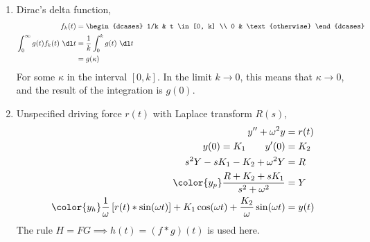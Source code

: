 \begin{enumerate}
\begin{enumerate}
              \item Dirac's delta function,
                    \begin{align}
                        f_k(t)        & = \begin{dcases}
                                              1/k & t \in [0, k]     \\
                                              0   & \text{otherwise}
                                          \end{dcases}              \\
                        \int_{0}^{\infty} g(t)
                        f_k(t)\ \dl t & = \frac{1}{k}\int_{0}^{k} g(t)\ \dl t \\
                                      & = g(\kappa)
                    \end{align}
                    For some $ \kappa $ in the interval $ [0, k] $. In the limit
                    $ k \rightarrow 0 $, this means that $ \kappa \rightarrow 0 $, and the
                    result of the integration is $ g(0) $.

              \item Unspecified driving force $ r(t) $ with Laplace transform $ R(s) $,
                    \begin{align}
                        y'' + \omega^2 y               & = r(t) \\
                        y(0) = K_1 \qquad y'(0)        & = K_2  \\
                        s^2Y - sK_1 - K_2 + \omega^2 Y & = R    \\
                        \color{y_p} \frac{R + K_2 + sK_1}
                        {s^2 + \omega^2}               & = Y    \\
                        \color{y_h} \frac{1}{\omega}
                        \left[ r(t) * \sin(\omega t) \right]
                        + K_1 \cos(\omega t) + \frac{K_2}
                        {\omega} \sin(\omega t)        & = y(t)
                    \end{align}
                    The rule $ H = FG \implies h(t) = (f * g)(t) $ is used here.
          \end{enumerate}


\end{enumerate}
